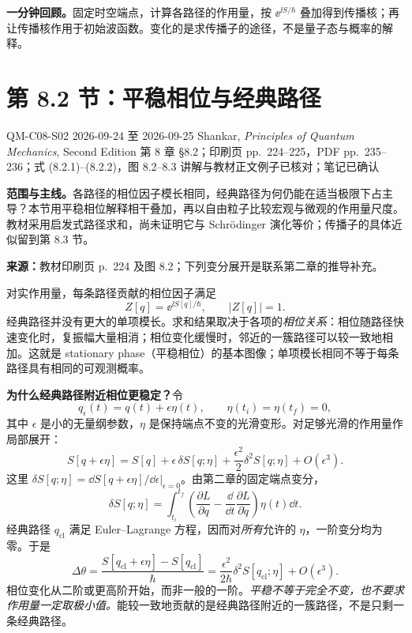 \textbf{一分钟回顾。}固定时空端点，计算各路径的作用量，按 $\ee^{\ii S/\hbar}$ 叠加得到传播核；再让传播核作用于初始波函数。变化的是求传播子的途径，不是量子态与概率的解释。

\section{第 8.2 节：平稳相位与经典路径}
\label{section:QM-C08-S02}
\studymeta
  {QM-C08-S02}
  {2026-09-24 至 2026-09-25}
  {Shankar, \textit{Principles of Quantum Mechanics}, Second Edition}
  {第 8 章 \S 8.2；印刷页 pp.~224--225，PDF pp.~235--236；式 (8.2.1)--(8.2.2)，图 8.2--8.3}
  {讲解与教材正文例子已核对；笔记已确认}

\textbf{范围与主线。}各路径的相位因子模长相同，经典路径为何仍能在适当极限下占主导？本节用平稳相位解释相干叠加，再以自由粒子比较宏观与微观的作用量尺度。教材采用启发式路径求和，尚未证明它与 Schrödinger 演化等价；传播子的具体近似留到第 8.3 节。

\textbf{来源：}教材印刷页 p.~224 及图 8.2；下列变分展开是联系第二章的推导补充。

对实作用量，每条路径贡献的相位因子满足
\begin{equation}
  Z[q]=\ee^{\ii S[q]/\hbar},\qquad |Z[q]|=1.
\end{equation}
经典路径并没有更大的单项模长。求和结果取决于各项的\emph{相位关系}：相位随路径快速变化时，复振幅大量相消；相位变化缓慢时，邻近的一簇路径可以较一致地相加。这就是 stationary phase（平稳相位）的基本图像；单项模长相同不等于每条路径具有相同的可观测概率。

\textbf{为什么经典路径附近相位更稳定？}令
\begin{equation}
  q_\epsilon(t)=q(t)+\epsilon\eta(t),\qquad
  \eta(t_i)=\eta(t_f)=0,
\end{equation}
其中 $\epsilon$ 是小的无量纲参数，$\eta$ 是保持端点不变的光滑变形。对足够光滑的作用量作局部展开：
\begin{equation}
  S[q+\epsilon\eta]
  =S[q]+\epsilon\,\delta S[q;\eta]
      +\frac{\epsilon^2}{2}\delta^2S[q;\eta]+O(\epsilon^3).
  \label{eq:QM-C08-S02-action-expansion}
\end{equation}
这里 $\delta S[q;\eta]=\left.\dd S[q+\epsilon\eta]/\dd\epsilon\right|_{\epsilon=0}$。由第二章的固定端点变分，
\begin{equation}
  \delta S[q;\eta]
  =\int_{t_i}^{t_f}\left(
      \frac{\partial L}{\partial q}
      -\frac{\dd}{\dd t}\frac{\partial L}{\partial\dot q}
    \right)\eta(t)\dd t.
\end{equation}
经典路径 $q_{\mathrm{cl}}$ 满足 Euler--Lagrange 方程，因而对\emph{所有}允许的 $\eta$，一阶变分均为零。于是
\begin{equation}
  \Delta\theta
  =\frac{S[q_{\mathrm{cl}}+\epsilon\eta]-S[q_{\mathrm{cl}}]}{\hbar}
  =\frac{\epsilon^2}{2\hbar}\delta^2S[q_{\mathrm{cl}};\eta]
       +O(\epsilon^3).
\end{equation}
相位变化从二阶或更高阶开始，而非一般的一阶。\emph{平稳不等于完全不变，也不要求作用量一定取极小值。}能较一致地贡献的是经典路径附近的一簇路径，不是只剩一条经典路径。

